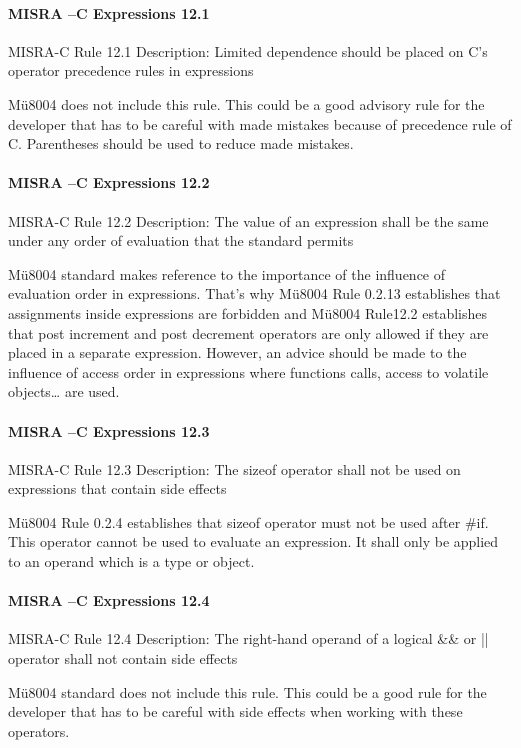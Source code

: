 \paragraph{MISRA –C Expressions 12.1}
MISRA-C Rule 12.1 Description: Limited dependence should be placed on C’s operator precedence rules in expressions

Mü8004 does not include this rule. This could be a good advisory rule for the developer that has to be careful with made mistakes because of precedence rule of C. Parentheses should be used to reduce made mistakes.

\paragraph{MISRA –C Expressions 12.2}
MISRA-C Rule 12.2 Description: The value of an expression shall be the same under any order of evaluation that the standard permits

Mü8004 standard makes reference to the importance of the influence of evaluation order in expressions.  That’s why Mü8004 Rule 0.2.13 establishes that assignments inside expressions are forbidden and Mü8004 Rule12.2 establishes that post increment and post decrement operators are only allowed if they are placed in a separate expression. However, an advice should be made to the influence of access order in expressions where functions calls, access to volatile objects… are used.

\paragraph{MISRA –C Expressions 12.3}
MISRA-C Rule 12.3 Description: The sizeof operator shall not be used on expressions that contain side effects

Mü8004 Rule 0.2.4 establishes that sizeof operator must not be used after \#if. This operator cannot be used to evaluate an expression. It shall only be applied to an operand which is a type or object.

\paragraph{MISRA –C Expressions 12.4}
MISRA-C Rule 12.4 Description: The right-hand operand of a logical \&\& or || operator shall not contain side effects

Mü8004 standard does not include this rule. This could be a good rule for the developer that has to be careful with side effects when working with these operators.


